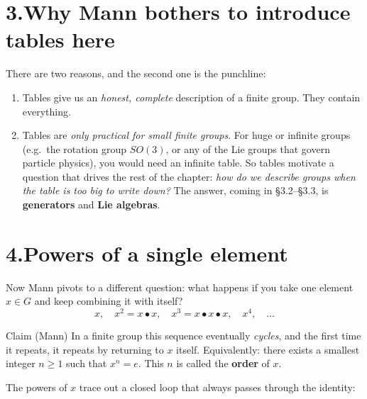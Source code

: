 \documentclass[11pt]{article}
\begin{document}
\section*{3.\quad Why Mann bothers to introduce tables here}

There are two reasons, and the second one is the punchline:

\begin{enumerate}[leftmargin=2em, itemsep=3pt]
  \item Tables give us an \emph{honest, complete} description of a finite
    group. They contain everything.
  \item Tables are \emph{only practical for small finite groups}. For huge
    or infinite groups (e.g.\ the rotation group $SO(3)$, or any of the
    Lie groups that govern particle physics), you would need an infinite
    table. So tables motivate a question that drives the rest of the
    chapter: \emph{how do we describe groups when the table is too big to
    write down?} The answer, coming in \S3.2--\S3.3, is
    \textbf{generators} and \textbf{Lie algebras}.
\end{enumerate}

\section*{4.\quad Powers of a single element}

Now Mann pivots to a different question: what happens if you take one
element $x \in G$ and keep combining it with itself?
\[
  x, \quad x^2 = x \bullet x, \quad x^3 = x \bullet x \bullet x, \quad
  x^4, \quad \ldots
\]

\begin{keybox}{Claim (Mann)}
In a finite group this sequence eventually \emph{cycles}, and the first
time it repeats, it repeats by returning to $x$ itself. Equivalently:
there exists a smallest integer $n \geq 1$ such that $x^n = e$. This $n$
is called the \textbf{order} of $x$.
\end{keybox}

The powers of $x$ trace out a closed loop that always passes through the
identity:
\end{document}
